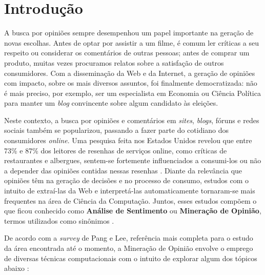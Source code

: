 \chapter{Introdução}


A busca por opiniões sempre desempenhou um papel importante na geração de novas escolhas. Antes de optar por assistir a um filme, é comum ler críticas a seu respeito ou considerar os comentários de outras pessoas; antes de comprar um produto, muitas vezes procuramos relatos sobre a satisfação de outros consumidores. Com a disseminação da Web e da Internet, a geração de opiniões com impacto, sobre os mais diversos assuntos, foi finalmente democratizada: não é mais preciso, por exemplo, ser um especialista em Economia ou Ciência Política para manter um \emph{blog} convincente sobre algum candidato às eleições.

Neste contexto, a busca por opiniões e comentários em \emph{sites}, \emph{blogs}, fóruns e redes sociais também se popularizou, passando a fazer parte do cotidiano dos consumidores \emph{online}. Uma pesquisa feita nos Estados Unidos revelou que entre 73\% e 87\% dos leitores de resenhas de serviços online, como críticas de restaurantes e albergues, sentem-se fortemente influenciados a consumi-los ou não a depender das opiniões contidas nessas resenhas \cite{pesquisa-eua}. Diante da relevância que opiniões têm na geração de decisões e no processo de consumo, estudos com o intuito de extraí-las da Web e interpretá-las automaticamente tornaram-se mais frequentes na área de Ciência da Computação. Juntos, esses estudos compõem o que ficou conhecido como \textbf{Análise de Sentimento} ou \textbf{Mineração de Opinião}, termos utilizados como sinônimos \cite{omsa} \cite{bingliu}.

De acordo com a \emph{survey} de Pang e Lee, referência mais completa para o estudo da área encontrada até o momento, a Mineração de Opinião envolve o emprego de diversas técnicas computacionais com o intuito de explorar algum dos tópicos abaixo \cite{omsa}:

